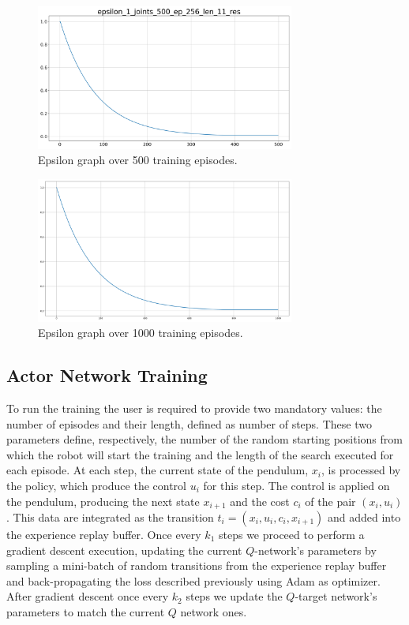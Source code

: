 \documentclass[twocolumn, a4paper]{article}
\begin{document}
\label{fig:TrainLoss1}
\begin{figure}[H]
	\centering
	\includegraphics[width=8.5cm]{"../Figures/epsilon_1J_500E_256EL_11RES.png"} \\
	\caption{Epsilon graph over 500 training episodes.}
	\includegraphics[width=8.5cm]{"../Figures/epsilon_1J_1000E_256EL_11RES.png"}
	\caption{Epsilon graph over 1000 training episodes.}
\end{figure}

\subsection{Actor Network Training}
To run the training the user is required to provide two mandatory values: the
number of episodes and their length, defined as number of steps.
These two parameters define, respectively, the number of the random starting
positions from which the robot will start the training and the length of the
search executed for each episode. At each step, the current state of the
pendulum, \(x_{i}\), is processed by the policy, which produce the control
\(u_{i}\) for this step. The control is applied on the pendulum, producing the
next state \(x_{i+1}\) and the cost \(c_{i}\) of the pair
\((x_{i},u_{i})\). This data are integrated as the transition \(t_{i}=(x_{i},
u_{i}, c_{i}, x_{i+1})\) and added into the experience replay buffer. Once
every \(k_{1}\) steps we proceed to perform a gradient descent execution,
updating the current \(Q\)-network's parameters by sampling a mini-batch of
random transitions from the experience replay buffer and back-propagating the
loss described previously using Adam as optimizer. After gradient descent once
every \(k_{2}\) steps we update the \(Q\)-target network's parameters to match
the current \(Q\) network ones.
\end{document}
